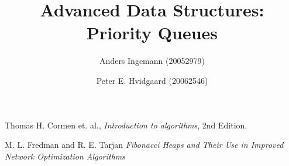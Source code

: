 \documentclass[12pt,a4paper]{report}
\title{Advanced Data Structures: Priority Queues}
\author{Anders Ingemann (20052979) \and Peter E. Hvidgaard (20062546)}
\begin{document}
\maketitle








\pagebreak
\begin{thebibliography}{3}

Thomas H. Cormen et. al.,
\emph{Introduction to algorithms},
2nd Edition.

M. L. Fredman and R. E. Tarjan
\emph{Fibonacci Heaps and Their Use in Improved Network Optimization Algorithms}

\end{thebibliography}
\end{document}
